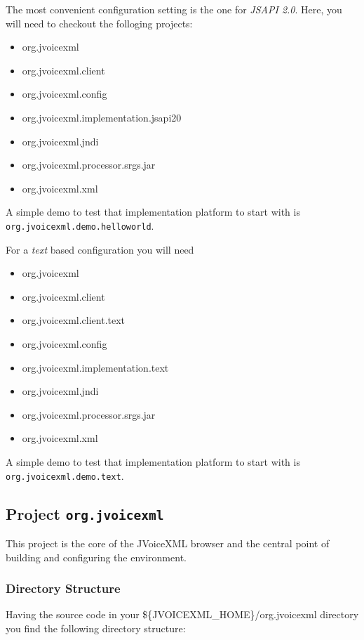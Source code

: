 \documentclass[11pt,a4paper]{article}
\begin{document}
The most convenient configuration setting is the one for \emph{JSAPI 2.0}. Here,
you will need to checkout the folloging projects:
\begin{itemize}
  \item org.jvoicexml
  \item org.jvoicexml.client
  \item org.jvoicexml.config
  \item org.jvoicexml.implementation.jsapi20
  \item org.jvoicexml.jndi
  \item org.jvoicexml.processor.srgs.jar
  \item org.jvoicexml.xml
\end{itemize}

A simple demo to test that implementation platform to start with is
\lstinline{org.jvoicexml.demo.helloworld}.


 For a \emph{text} based configuration
you will need
\begin{itemize}
  \item org.jvoicexml
  \item org.jvoicexml.client
  \item org.jvoicexml.client.text
  \item org.jvoicexml.config
  \item org.jvoicexml.implementation.text
  \item org.jvoicexml.jndi
  \item org.jvoicexml.processor.srgs.jar
  \item org.jvoicexml.xml
\end{itemize}

A simple demo to test that implementation platform to start with is
\lstinline{org.jvoicexml.demo.text}.

\subsection{Project \texttt{org.jvoicexml}}

This project is the core of the JVoiceXML browser and the central point of
building and configuring the environment.

\subsubsection{Directory Structure}
\label{sec:directory-structure}

Having the source code in your \$\{JVOICEXML\_HOME\}/org.jvoicexml
directory you find the following directory structure:
\end{document}
